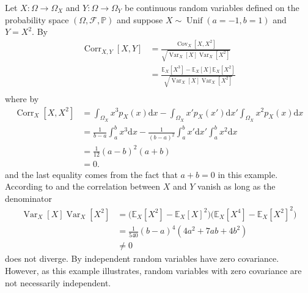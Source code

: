 \begin{example}
	Let $X\colon\Omega \to \Omega_X$ and $Y\colon\Omega\to \Omega_Y$ be continuous random variables defined on the probability space $(\Omega,\mathcal{F},\mathbb{P})$ and suppose $X\sim \operatorname{Unif}(a=-1, b=1)$ and $Y=X^2$. By  
	\begin{equation}
		\begin{split}
			\operatorname{Corr}_{X,Y}[X,Y] & = \frac{\operatorname{Cov}_{X}[X,X^2]}{\sqrt{\operatorname{Var}_X[X]\operatorname{Var}_X[X^2]}}\\
			& = \frac{\mathbb{E}_{X}[X^3]-\mathbb{E}_X[X]\mathbb{E}_X[X^2]}{\sqrt{\operatorname{Var}_X[X]\operatorname{Var}_X[X^2]}}\\
		\end{split}
		\label{ex:eq_corr}
	\end{equation}
	where by 
	\begin{equation}
		\begin{split}
			\operatorname{Corr}_{X}[X,X^2] &= \int_{\Omega_X} x^3 p_X(x) \mathrm{d}x-\int_{\Omega_X} x'p_X(x') \mathrm{d}x'\int_{\Omega_X} x^2p_X(x) \mathrm{d}x\\
			&= \frac{1}{b-a}\int_{a}^{b}x^3\mathrm{d}x-\frac{1}{(b-a)^2}\int_{a}^{b} x' \mathrm{d}x'\int_{a}^{b} x^2 \mathrm{d}x\\
			&= \frac{1}{12}(a-b)^2(a+b)\\
			&=0.
		\end{split}
		\label{ex:eq_cov}
	\end{equation}
	and the last equality comes from the fact that $a+b = 0$ in this example. According to  and  the correlation between $X$ and $Y$ vanish as long as the denominator
	\begin{equation}
		\begin{split}
			\operatorname{Var}_X[X]\operatorname{Var}_X[X^2] & =\big(\mathbb{E}_X[X^2]-\mathbb{E}_X[X]^2\big) \big(\mathbb{E}_X[X^4]-\mathbb{E}_X[X^2]^2\big)\\
			& = \frac{1}{540}(b-a)^4(4a^2+7ab+4b^2)\\
			&\neq 0
		\end{split}
	\end{equation}
	does not diverge. By  independent random variables have zero covariance. However, as this example illustrates, random variables with zero covariance are not necessarily independent.
\end{example}

